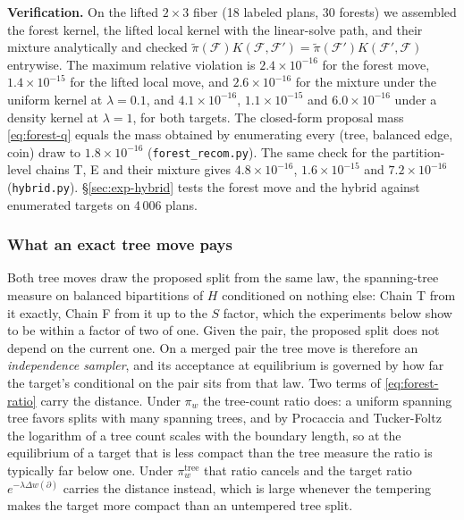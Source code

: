 \documentclass[11pt]{article}
\begin{document}
\textbf{Verification.} On the lifted $2 \times 3$ fiber (18 labeled
plans, 30 forests) we assembled the forest kernel, the lifted local
kernel with the linear-solve path, and their mixture analytically and
checked $\tilde\pi(\mathcal{F})K(\mathcal{F},\mathcal{F}') =
\tilde\pi(\mathcal{F}')K(\mathcal{F}',\mathcal{F})$ entrywise. The
maximum relative violation is $2.4 \times 10^{-16}$ for the forest
move, $1.4 \times 10^{-15}$ for the lifted local move, and
$2.6 \times 10^{-16}$ for the mixture under the uniform kernel at
$\lambda = 0.1$, and $4.1 \times 10^{-16}$, $1.1 \times 10^{-15}$ and
$6.0 \times 10^{-16}$ under a density kernel at $\lambda = 1$, for
both targets. The closed-form proposal mass
\eqref{eq:forest-q} equals the mass obtained by enumerating every
(tree, balanced edge, coin) draw to $1.8 \times 10^{-16}$
(\texttt{forest\_recom.py}). The same check for the partition-level
chains T, E and their mixture gives $4.8 \times 10^{-16}$,
$1.6 \times 10^{-15}$ and $7.2 \times 10^{-16}$ (\texttt{hybrid.py}).
\S\ref{sec:exp-hybrid} tests the forest move and the hybrid against
enumerated targets on 4\,006 plans.

\subsubsection{What an exact tree move pays}\label{sec:tree-pays}

Both tree moves draw the proposed split from the same law, the
spanning-tree measure on balanced bipartitions of $H$ conditioned on
nothing else: Chain T from it exactly, Chain F from it up to the
$S$ factor, which the experiments below show to be within a factor of
two of one. Given the pair, the proposed split does not depend on the
current one. On a merged pair the tree move is therefore an
\emph{independence sampler}, and its acceptance at equilibrium is
governed by how far the target's conditional on the pair sits from
that law. Two terms of \eqref{eq:forest-ratio} carry the distance.
Under $\pi_w$ the tree-count ratio does: a uniform spanning tree
favors splits with many spanning trees, and by Procaccia and
Tucker-Foltz~\cite{procaccia2022compact} the logarithm of a tree
count scales with the boundary length, so at the equilibrium of a
target that is less compact than the tree measure the ratio is
typically far below one. Under $\pi_w^{\mathrm{tree}}$ that ratio
cancels and the target ratio $e^{-\lambda \Delta w(\partial)}$
carries the distance instead, which is large whenever the tempering
makes the target more compact than an untempered tree split.
\end{document}
